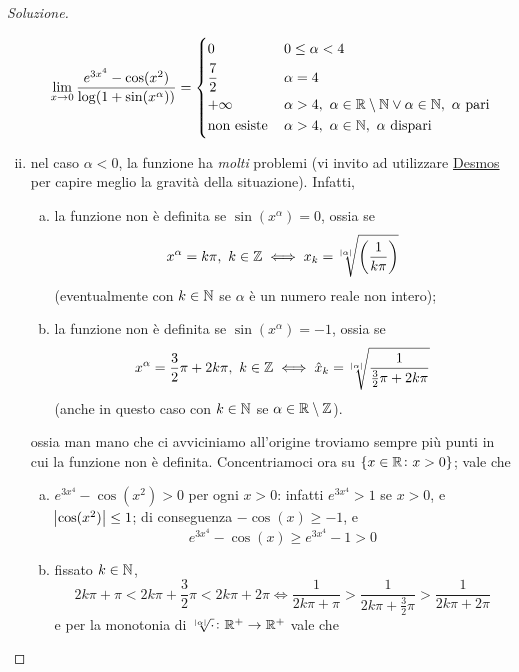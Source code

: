 \begin{proof}[Soluzione]
\begin{enumerate}[(i)]
        \[
        \lim_{x\to 0} \frac{e^{3x^4}-\cos(x^2)}{\log(1+\sin(x^\alpha))} = \begin{dcases}
            0\, & 0\le \alpha<4\\
            \frac{7}{2}\, & \alpha=4 \\
            +\infty\, & \alpha>4, \ \alpha\in\amsbb{R}\setminus \amsbb{N} \lor \alpha\in\amsbb{N}, \ \alpha \ \text{pari} \\
            \text{non esiste}\, & \alpha>4, \ \alpha\in\amsbb{N}, \ \alpha \ \text{dispari} 
        \end{dcases}
        \]
        \item nel caso $\alpha<0$, la funzione ha \emph{molti} problemi (vi invito ad utilizzare \href{https://www.desmos.com/calculator}{Desmos} per capire meglio la gravità della situazione).
        Infatti,
        \begin{enumerate}[(a)]
            \item la funzione non è definita se $\sin(x^\alpha) = 0$, ossia se 
            \[
            x^{\alpha} = k\pi, \ k\in\amsbb{Z} \iff x_k = \sqrt[\abs{\alpha}]{\left(\frac{1}{k\pi}\right)}
            \]
            (eventualmente con $k\in\amsbb{N}$ se $\alpha$ è un numero reale non intero);
            \item la funzione non è definita se $\sin(x^\alpha)=-1$, ossia se
            \[
            x^\alpha = \frac{3}{2}\pi + 2k\pi, \ k\in\amsbb{Z} \iff \hat{x}_k =\sqrt[\abs{\alpha}]{\frac{1}{\frac{3}{2}\pi + 2k\pi}}
            \]
            (anche in questo caso con $k\in\amsbb{N}$ se $\alpha\in\amsbb{R}\setminus \amsbb{Z}$).
        \end{enumerate}
        ossia man mano che ci avviciniamo all'origine troviamo sempre più punti in cui la funzione non è definita. Concentriamoci ora su $\{x\in\amsbb{R}\colon x>0\}$; vale che
        \begin{enumerate}[(a)]
            \item $e^{3x^4}-\cos(x^2)>0$ per ogni $x>0$: infatti $e^{3x^4}>1$ se $x>0$, e $\abs{\cos(x^2)}\le 1$; di conseguenza $-\cos(x)\ge -1$, e 
            \[
            e^{3x^4}-\cos(x)\ge e^{3x^4}-1 >0
            \]
            \item fissato $k\in\amsbb{N}$,
            \[
            2k\pi + \pi  < 2k\pi + \frac{3}{2}\pi < 2k\pi + 2\pi \iff \frac{1}{2k\pi + \pi}> \frac{1}{2k\pi + \frac{3}{2}\pi}>\frac{1}{2k\pi + 2\pi}
            \]
            e per la monotonia di $\sqrt[\abs{\alpha}]{\cdot}\colon \amsbb{R}^+\to\amsbb{R}^+$ vale che

\end{enumerate}
\end{enumerate}
\end{proof}
